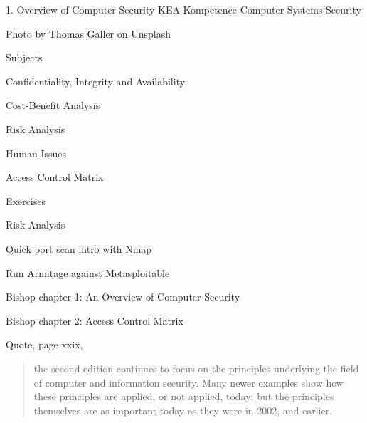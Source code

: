 \documentclass[Screen16to9,17pt]{foils}
\begin{document}
\mytitlepage
{1. Overview of Computer Security}
{KEA Kompetence Computer Systems Security \the\year}



 
\begin{list2}
\item
\end{list2}

{\small\hfill  Photo by Thomas Galler on Unsplash}
  

\begin{list1}
\item Subjects
\begin{list2}
\item Confidentiality, Integrity and Availability
\item Cost-Benefit Analysis
\item Risk Analysis
\item Human Issues
\item Access Control Matrix
\end{list2}
\item Exercises
\begin{list2}
\item Risk Analysis
\item Quick port scan intro with Nmap
\item Run Armitage against Metasploitable
\end{list2}
\end{list1}




\begin{list1}
\item Bishop chapter 1: An Overview of Computer Security
\item Bishop chapter 2: Access Control Matrix
\end{list1}

Quote, page xxix,\\
\begin{quote}
the second edition continues to focus on the principles underlying the field of computer and information security. Many newer examples show how these principles are applied, or not applied, today; but the principles themselves are as important today as they were in 2002, and earlier.
\end{quote}
\end{document}
